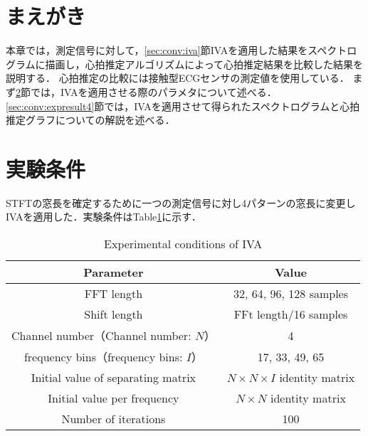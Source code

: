 \section{まえがき}
本章では，測定信号に対して，\ref{sec:conv:iva}節IVAを適用した結果をスペクトログラムに描画し，心拍推定アルゴリズムによって心拍推定結果を比較した結果を説明する．
心拍推定の比較には接触型ECGセンサの測定値を使用している．
まず\ref{sec:conv:expcondition4}節では，IVAを適用させる際のパラメタについて述べる．
\ref{sec:conv:expresult4}節では，IVAを適用させて得られたスペクトログラムと心拍推定グラフについての解説を述べる．

\section{実験条件}
\label{sec:conv:expcondition4}
STFTの窓長を確定するために一つの測定信号に対し4パターンの窓長に変更しIVAを適用した．実験条件はTable\ref{tab:iva}に示す．
\begin{table}[t]
  \caption{Experimental conditions of IVA}
  \centering
  \begin{tabular}{cc} \hline
    Parameter & Value \\ \hline \hline
    FFT length & 32, 64, 96, 128 samples  \\ \hline
    Shift length & FFt length/16 samples \\ \hline
    Channel number（Channel number: $N$） & 4 \\ \hline
    frequency bins（frequency bins: $I$） & 17, 33, 49, 65 \\ \hline
    Initial value of separating matrix & $N \times N \times I$ identity matrix  \\ \hline
    Initial value per frequency & $N \times N$ identity matrix  \\ \hline
    Number of iterations & 100\\ \hline
  \end{tabular}
  \label{tab:iva}
\end{table}

